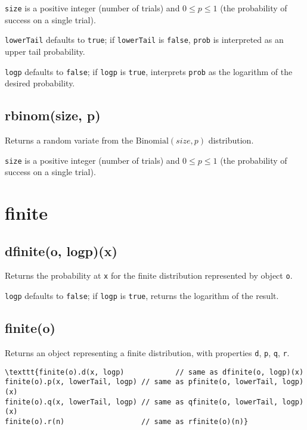 \documentclass{article}
\begin{document}
\texttt{size} is a positive integer (number of trials) and $0 \leq p \leq 1$
(the probability of success on a single trial).


\texttt{lowerTail} defaults to \texttt{true}; if \texttt{lowerTail} is \texttt{false}, \texttt{prob} is
interpreted as an upper tail probability.


\texttt{logp} defaults to \texttt{false}; if \texttt{logp} is \texttt{true}, interprets \texttt{prob} as
the logarithm of the desired probability.


    \subsection*{rbinom(size, p)}
    Returns a random variate from the $\textrm{Binomial}(size, p)$ distribution.


\texttt{size} is a positive integer (number of trials) and $0 \leq p \leq 1$
(the probability of success on a single trial).


  \section{finite}
    \subsection*{dfinite(o, logp)(x)}
    Returns the probability at \texttt{x} for the finite distribution
represented by object \texttt{o}.


\texttt{logp} defaults to \texttt{false}; if \texttt{logp} is \texttt{true}, returns the
logarithm of the result.


    \subsection*{finite(o)}
    Returns an object representing a finite distribution, with properties
\texttt{d}, \texttt{p}, \texttt{q}, \texttt{r}.


\begin{lstlisting}
\texttt{finite(o).d(x, logp)            // same as dfinite(o, logp)(x)
finite(o).p(x, lowerTail, logp) // same as pfinite(o, lowerTail, logp)(x)
finite(o).q(x, lowerTail, logp) // same as qfinite(o, lowerTail, logp)(x)
finite(o).r(n)                  // same as rfinite(o)(n)}\end{lstlisting}
\end{document}
